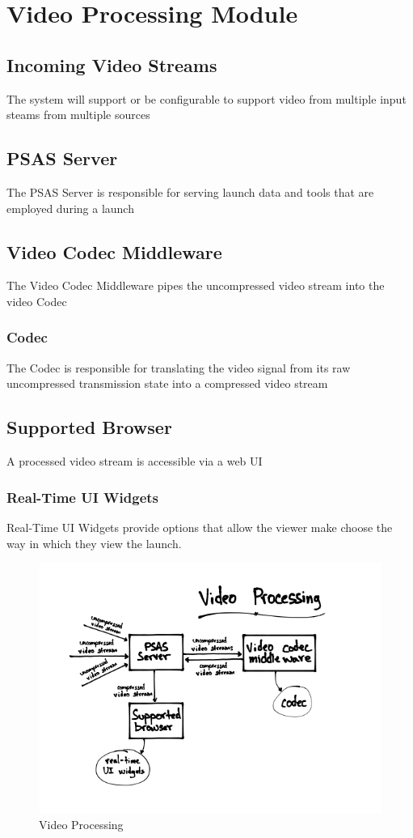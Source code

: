 \section{Video Processing Module}

\subsection{Incoming Video Streams}
The system will support or be configurable to support video from multiple input steams from multiple sources

\subsection{PSAS Server}
The PSAS Server is responsible for serving launch data and tools that are
employed during a launch

\subsection{Video Codec Middleware}
The Video Codec Middleware pipes the uncompressed video stream into the video Codec

\subsubsection{Codec}
The Codec is responsible for translating the video signal from its raw uncompressed transmission state into a compressed video stream

\subsection{Supported Browser}
A processed video stream is accessible via a web UI

\subsubsection{Real-Time UI Widgets}
Real-Time UI Widgets provide options that allow the viewer make choose the way
in which they view the launch.

\begin{figure}
  \centering
  \includegraphics{imgs/VideoProcessing.png}
  \caption{Video Processing}
\end{figure}
